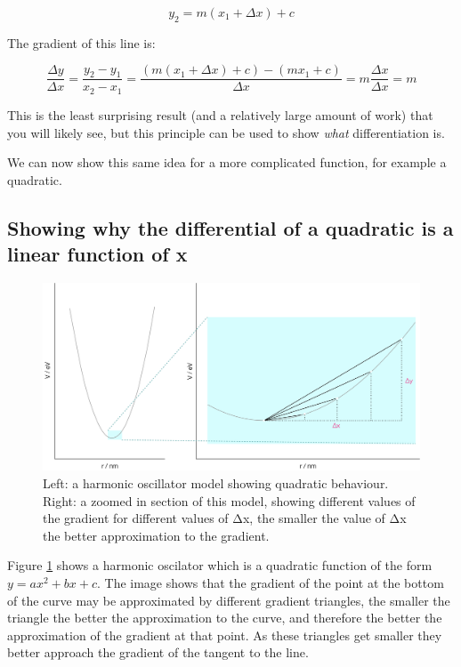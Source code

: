 \documentclass[
]{book}
\begin{document}
\begin{equation*}
y_2 = m(x_1+ \Delta x) + c
\end{equation*}

The gradient of this line is:

\begin{equation*}
\frac{\Delta y}{\Delta x} = \frac{y_2-y_1}{x_2-x_1}=\frac{(m(x_1+ \Delta x) + c) - (mx_1 + c)}{\Delta x} = m\frac{\Delta x}{\Delta x}=m
\end{equation*}

This is the least surprising result (and a relatively large amount of work) that you will likely see, but this principle can be used to show \emph{what} differentiation is.

We can now show this same idea for a more complicated function, for example a quadratic.

\hypertarget{showing-why-the-differential-of-a-quadratic-is-a-linear-function-of-x}{%
\subsection{Showing why the differential of a quadratic is a linear function of x}\label{showing-why-the-differential-of-a-quadratic-is-a-linear-function-of-x}}

\begin{figure}

{\centering \includegraphics[width=0.8\linewidth]{images/quadratic} 

}

\caption{Left: a harmonic oscillator model showing quadratic behaviour. Right: a zoomed in section of this model, showing different values of the gradient for different values of Δx, the smaller the value of Δx the better approximation to the gradient.}\label{fig:quad}
\end{figure}

Figure \ref{fig:quad} shows a harmonic oscilator which is a quadratic function of the form \(y=ax^2+bx+c\). The image shows that the gradient of the point at the bottom of the curve may be approximated by different gradient triangles, the smaller the triangle the better the approximation to the curve, and therefore the better the approximation of the gradient at that point. As these triangles get smaller they better approach the gradient of the tangent to the line.
\end{document}
